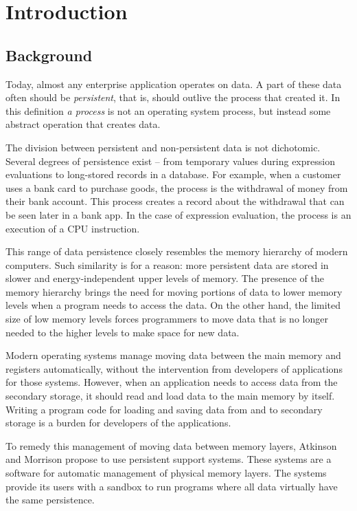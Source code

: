 \chapter{Introduction}

\section{Background}

Today, almost any enterprise application operates on data. A part of these data
often should be \textit{persistent}, that is, should outlive the process that
created it. In this definition \textit{a process} is not an operating system 
process, but instead some abstract operation that creates data. 

The division between persistent and non-persistent data is not dichotomic.
Several degrees of persistence exist -- from temporary values during expression
evaluations to long-stored records in a database. For example, when a customer
uses a bank card to purchase goods, the process is the withdrawal of money from
their bank account. This process creates a record about the withdrawal that can
be seen later in a bank app. In the case of expression evaluation, the process
is an execution of a CPU instruction. 

This range of data persistence closely resembles the memory hierarchy of modern
computers. Such similarity is for a reason: more persistent data are stored in
slower and energy-independent upper levels of memory. The presence of the
memory hierarchy brings the need for moving portions of data to lower memory
levels when a program needs to access the data. On the other hand, the limited
size of low memory levels forces programmers to move data that is no longer
needed to the higher levels to make space for new data.

Modern operating systems manage moving data between the main memory and
registers automatically, without the intervention from developers of
applications for those systems. However, when an application needs to access
data from the secondary storage, it should read and load data to the main
memory by itself. Writing a program code for loading and saving data from and to
secondary storage is a burden for developers of the applications.

To remedy this management of moving data between memory layers, Atkinson and
Morrison \cite{atkinson1995orthogonally} propose to use persistent support
systems. These systems are a software for automatic management of physical
memory layers. The systems provide its users with a sandbox to run programs
where all data virtually have the same persistence.

